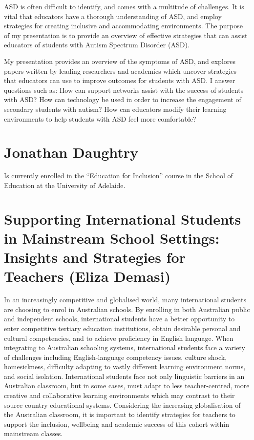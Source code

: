 \documentclass[twoside,12pt,a4paper,notitlepage]{memoir}
\begin{document}
ASD is often difficult to identify, and comes with a multitude of challenges. It is vital that educators have a thorough understanding of ASD, and employ strategies for creating inclusive and accommodating environments. The purpose of my presentation is to provide an overview of effective strategies that can assist educators of students with Autism Spectrum Disorder (ASD).
 
My presentation provides an overview of the symptoms of ASD, and explores papers written by leading researchers and academics which uncover strategies that educators can use to improve outcomes for students with ASD. I answer questions such as: How can support networks assist with the success of students with ASD? How can technology be used in order to increase the engagement of secondary students with autism? How can educators modify their learning environments to help students with ASD feel more comfortable?


\section*{Jonathan Daughtry}

Is currently enrolled in the ``Education for Inclusion'' course in the School of Education at the University of Adelaide.



\pagebreak
\section*{Supporting International Students in Mainstream School Settings: Insights and Strategies for Teachers (Eliza Demasi)}
\label{aut:demasi}

In an increasingly competitive and globalised world, many international students are choosing to enrol in Australian schools. By enrolling in both Australian public and independent schools, international students have a better opportunity to enter competitive tertiary education institutions, obtain desirable personal and cultural competencies, and to achieve proficiency in English language. When integrating to Australian schooling systems, international students face a variety of challenges including English-language competency issues, culture shock, homesickness, difficulty adapting to vastly different learning environment norms, and social isolation. International students face not only linguistic barriers in an Australian classroom, but in some cases, must adapt to less teacher-centred, more creative and collaborative learning environments which may contrast to their source country educational systems. Considering the increasing globalisation of the Australian classroom, it is important to identify strategies for teachers to support the inclusion, wellbeing and academic success of this cohort within mainstream classes. 
\end{document}
